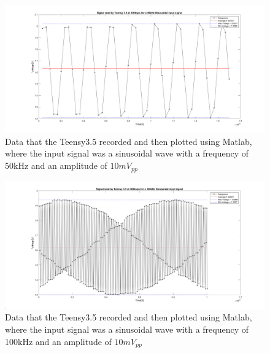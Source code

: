 \begin{figure}[h]
    \centering
    \includegraphics[width=1.0\textwidth]{graphics/50khzMatlab.png}
    \caption{Data that the Teensy3.5 recorded and then plotted using Matlab, where the input signal was a sinusoidal wave with a frequency of 50kHz and an amplitude of $10mV_{pp}$}
    \label{fig:50kmatlab}
\end{figure}

\begin{figure}[h]
    \centering
    \includegraphics[width=1.0\textwidth]{graphics/100khzMatlab.png}
    \caption{Data that the Teensy3.5 recorded and then plotted using Matlab, where the input signal was a sinusoidal wave with a frequency of 100kHz and an amplitude of $10mV_{pp}$}
    \label{fig:100kmatlab}
\end{figure}








